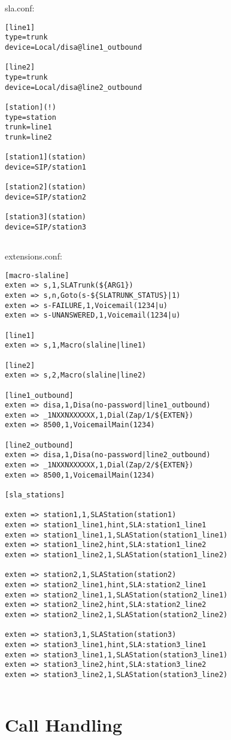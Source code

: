 \documentclass[12pt,a4]{article}
\begin{document}
sla.conf:
\begin{verbatim}
[line1]
type=trunk
device=Local/disa@line1_outbound

[line2]
type=trunk
device=Local/disa@line2_outbound

[station](!)
type=station
trunk=line1
trunk=line2

[station1](station)
device=SIP/station1

[station2](station)
device=SIP/station2

[station3](station)
device=SIP/station3
	
\end{verbatim}


extensions.conf:
\begin{verbatim}
[macro-slaline]
exten => s,1,SLATrunk(${ARG1})
exten => s,n,Goto(s-${SLATRUNK_STATUS}|1)
exten => s-FAILURE,1,Voicemail(1234|u)
exten => s-UNANSWERED,1,Voicemail(1234|u)

[line1]
exten => s,1,Macro(slaline|line1)

[line2]
exten => s,2,Macro(slaline|line2)

[line1_outbound]
exten => disa,1,Disa(no-password|line1_outbound)
exten => _1NXXNXXXXXX,1,Dial(Zap/1/${EXTEN})
exten => 8500,1,VoicemailMain(1234)

[line2_outbound]
exten => disa,1,Disa(no-password|line2_outbound)
exten => _1NXXNXXXXXX,1,Dial(Zap/2/${EXTEN})
exten => 8500,1,VoicemailMain(1234)

[sla_stations]

exten => station1,1,SLAStation(station1)
exten => station1_line1,hint,SLA:station1_line1
exten => station1_line1,1,SLAStation(station1_line1)
exten => station1_line2,hint,SLA:station1_line2
exten => station1_line2,1,SLAStation(station1_line2)

exten => station2,1,SLAStation(station2)
exten => station2_line1,hint,SLA:station2_line1
exten => station2_line1,1,SLAStation(station2_line1)
exten => station2_line2,hint,SLA:station2_line2
exten => station2_line2,1,SLAStation(station2_line2)

exten => station3,1,SLAStation(station3)
exten => station3_line1,hint,SLA:station3_line1
exten => station3_line1,1,SLAStation(station3_line1)
exten => station3_line2,hint,SLA:station3_line2
exten => station3_line2,1,SLAStation(station3_line2)
	
\end{verbatim}

\section{Call Handling}
\end{document}
